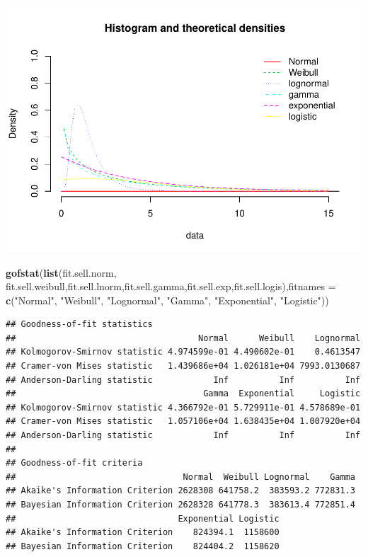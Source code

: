 \documentclass[]{article}
\newenvironment{Shaded}{\begin{snugshade}}{\end{snugshade}}
\newcommand{\KeywordTok}[1]{\textcolor[rgb]{0.13,0.29,0.53}{\textbf{#1}}}
\newcommand{\DataTypeTok}[1]{\textcolor[rgb]{0.13,0.29,0.53}{#1}}
\newcommand{\StringTok}[1]{\textcolor[rgb]{0.31,0.60,0.02}{#1}}
\newcommand{\NormalTok}[1]{#1}
\begin{document}
\includegraphics{analysis_files/figure-latex/unnamed-chunk-18-1.pdf}

\begin{Shaded}
\begin{Highlighting}[]
\KeywordTok{gofstat}\NormalTok{(}\KeywordTok{list}\NormalTok{(fit.sell.norm, fit.sell.weibull,fit.sell.lnorm,fit.sell.gamma,fit.sell.exp,fit.sell.logis),}\DataTypeTok{fitnames =} \KeywordTok{c}\NormalTok{(}\StringTok{"Normal"}\NormalTok{, }\StringTok{"Weibull"}\NormalTok{, }\StringTok{"Lognormal"}\NormalTok{, }\StringTok{"Gamma"}\NormalTok{, }\StringTok{"Exponential"}\NormalTok{, }\StringTok{"Logistic"}\NormalTok{))}
\end{Highlighting}
\end{Shaded}

\begin{verbatim}
## Goodness-of-fit statistics
##                                    Normal      Weibull    Lognormal
## Kolmogorov-Smirnov statistic 4.974599e-01 4.490602e-01    0.4613547
## Cramer-von Mises statistic   1.439686e+04 1.026181e+04 7993.0130687
## Anderson-Darling statistic            Inf          Inf          Inf
##                                     Gamma  Exponential     Logistic
## Kolmogorov-Smirnov statistic 4.366792e-01 5.729911e-01 4.578689e-01
## Cramer-von Mises statistic   1.057106e+04 1.638435e+04 1.007920e+04
## Anderson-Darling statistic            Inf          Inf          Inf
## 
## Goodness-of-fit criteria
##                                 Normal  Weibull Lognormal    Gamma
## Akaike's Information Criterion 2628308 641758.2  383593.2 772831.3
## Bayesian Information Criterion 2628328 641778.3  383613.4 772851.4
##                                Exponential Logistic
## Akaike's Information Criterion    824394.1  1158600
## Bayesian Information Criterion    824404.2  1158620
\end{verbatim}
\end{document}
